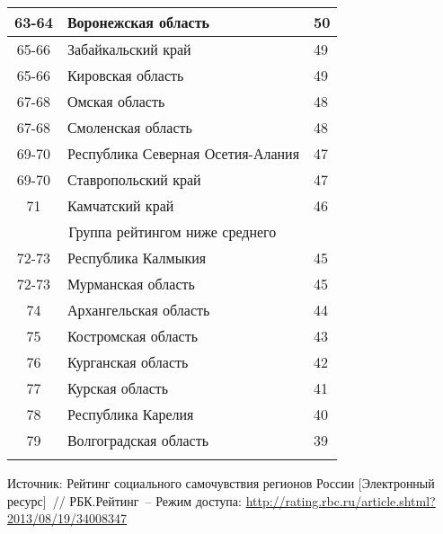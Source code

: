 \begin{table}[p]
\begin{tabular}{|c|l|l|}
      63-64 & Воронежская область               & 50         \\ \hline
      65-66 & Забайкальский край                & 49         \\ \hline
      65-66 & Кировская область                 & 49         \\ \hline
      67-68 & Омская область                    & 48         \\ \hline
      67-68 & Смоленская область                & 48         \\ \hline
      69-70 & Республика Северная Осетия-Алания & 47         \\ \hline
      69-70 & Ставропольский край               & 47         \\ \hline
      71    & Камчатский край                   & 46         \\ \hline
      \multicolumn{3}{|c|}{Группа рейтингом ниже среднего}   \\ \hline
      72-73 & Республика Калмыкия               & 45         \\ \hline
      72-73 & Мурманская область                & 45         \\ \hline
      74    & Архангельская область             & 44         \\ \hline
      75    & Костромская область               & 43         \\ \hline
      76    & Курганская область                & 42         \\ \hline
      77    & Курская область                   & 41         \\ \hline
      78    & Республика Карелия                & 40         \\ \hline
      79    & Волгоградская область             & 39         \\ \hline
      \multicolumn{3}{c}{}                                   \\
    \end{tabular}

    \begin{center}
      \vspace*{-3ex}
      \parbox{.8\textwidth}{\normalsize\center Источник: Рейтинг социального
        самочувствия регионов России [Электронный ресурс]~// РБК.Рейтинг~--
        Режим доступа:
        \url{http://rating.rbc.ru/article.shtml?2013/08/19/34008347}}
    \end{center}
  \end{table}

